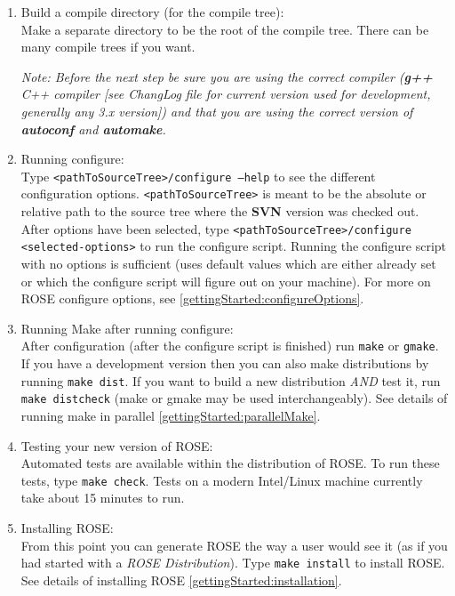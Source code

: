 \begin{enumerate}
     \item Build a compile directory (for the compile tree): \\
     Make a separate directory to be the root of the compile tree. There can be many compile 
     trees if you want.

     {\em Note: Before the next step be sure you are using the correct compiler ({\bf g++}
     C++ compiler
     [see ChangLog file for current version used for development, generally any 3.x
     version]) and that you are using the correct version of {\bf autoconf} and 
     {\bf automake}.}

     \item Running configure: \\
     Type {\tt <pathToSourceTree>/configure --help} to see the different configuration options.
     {\tt <pathToSourceTree>} is meant to be the absolute or relative path to the source tree
     where the {\bf SVN} version was checked out.  After options have been selected, type
     {\tt <pathToSourceTree>/configure <selected-options>} to run the configure script.
     Running the configure script with no options is sufficient (uses default values which
     are either already set or which the configure script will figure out on your machine).
     For more on ROSE configure options, see \ref{gettingStarted:configureOptions}.

     \item Running Make after running configure: \\
     After configuration (after the configure script is finished) run {\tt make} or {\tt gmake}.
     If you have a development version then you can also make distributions by running
     {\tt make dist}.  If you want to build a new distribution {\em AND} test it, 
     run {\tt make distcheck} (make or gmake may be used interchangeably). 
     See details of running make in parallel \ref{gettingStarted:parallelMake}.

     \item Testing your new version of ROSE: \\
     Automated tests are available within the distribution of ROSE. To run these tests,
     type {\tt make check}.  Tests on a modern Intel/Linux machine currently take about 
     15 minutes to run.

     \item Installing ROSE: \\
     From this point you can generate ROSE the way a user would see it (as if you had
     started with a {\em ROSE Distribution}).  Type {\tt make install} to install ROSE.
     See details of installing ROSE \ref{gettingStarted:installation}.


\end{enumerate}
